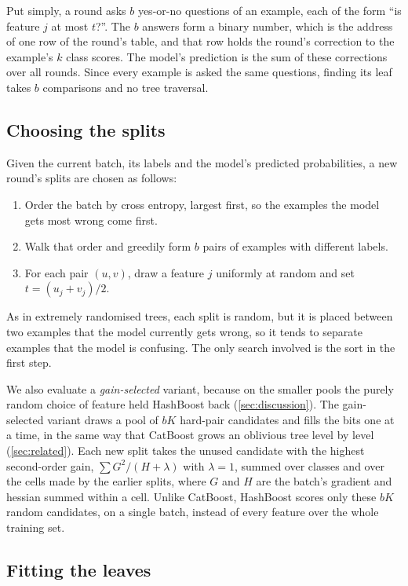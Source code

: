 \documentclass[a4paper, 11pt]{article}
\begin{document}
Put simply, a round asks $b$ yes-or-no questions of an example, each of the
form ``is feature $j$ at most $t$?''. The $b$ answers form a binary number,
which is the address of one row of the round's table, and that row holds the
round's correction to the example's $k$ class scores. The model's prediction
is the sum of these corrections over all rounds. Since every example is
asked the same questions, finding its leaf takes $b$ comparisons and no tree
traversal.

\subsection{Choosing the splits}
\label{sec:predicates}

Given the current batch, its labels and the model's predicted probabilities,
a new round's splits are chosen as follows:
\begin{enumerate}
    \item Order the batch by cross entropy, largest first, so the examples
          the model gets most wrong come first.
    \item Walk that order and greedily form $b$ pairs of examples with
          different labels.
    \item For each pair $(u, v)$, draw a feature $j$ uniformly at random and set
          $t = (u_j + v_j)/2$.
\end{enumerate}
As in extremely randomised trees, each split is random, but it is placed
between two examples that the model currently gets wrong, so it tends to
separate examples that the model is confusing. The only search involved is
the sort in the first step.

We also evaluate a \emph{gain-selected} variant, because on the smaller
pools the purely random choice of feature held HashBoost back
(\cref{sec:discussion}). The gain-selected variant draws a pool of $bK$ hard-pair candidates and fills the bits one at a time,
in the same way that CatBoost grows an oblivious tree level by level
(\cref{sec:related}). Each new split takes the unused candidate with the
highest second-order gain, $\sum G^2/(H+\lambda)$ with $\lambda = 1$, summed
over classes and over the cells made by the earlier splits, where $G$ and
$H$ are the batch's gradient and hessian summed within a cell. Unlike
CatBoost, HashBoost scores only these $bK$ random candidates, on a single
batch, instead of every feature over the whole training set.

\subsection{Fitting the leaves}
\label{sec:leaves}
\end{document}
